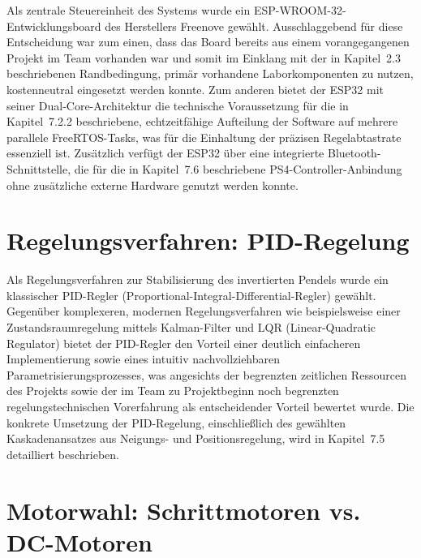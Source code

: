 \documentclass[12pt,ngerman,numbers=noenddot,abstracton,headsepline]{scrreprt}
\begin{document}
Als zentrale Steuereinheit des Systems wurde ein ESP-WROOM-32-Entwicklungsboard des Herstellers Freenove gewählt. Ausschlaggebend für diese Entscheidung war zum einen, dass das Board bereits aus einem vorangegangenen Projekt im Team vorhanden war und somit im Einklang mit der in Kapitel~2.3 beschriebenen Randbedingung, primär vorhandene Laborkomponenten zu nutzen, kostenneutral eingesetzt werden konnte. Zum anderen bietet der ESP32 mit seiner Dual-Core-Architektur die technische Voraussetzung für die in Kapitel~7.2.2 beschriebene, echtzeitfähige Aufteilung der Software auf mehrere parallele FreeRTOS-Tasks, was für die Einhaltung der präzisen Regelabtastrate essenziell ist. Zusätzlich verfügt der ESP32 über eine integrierte Bluetooth-Schnittstelle, die für die in Kapitel~7.6 beschriebene PS4-Controller-Anbindung ohne zusätzliche externe Hardware genutzt werden konnte.


\section{Regelungsverfahren: PID-Regelung}
\label{sec:pid_designentscheidung}

Als Regelungsverfahren zur Stabilisierung des invertierten Pendels wurde ein klassischer PID-Regler (Proportional-Integral-Differential-Regler) gewählt. Gegenüber komplexeren, modernen Regelungsverfahren wie beispielsweise einer Zustandsraumregelung mittels Kalman-Filter und LQR (Linear-Quadratic Regulator) bietet der PID-Regler den Vorteil einer deutlich einfacheren Implementierung sowie eines intuitiv nachvollziehbaren Parametrisierungsprozesses, was angesichts der begrenzten zeitlichen Ressourcen des Projekts sowie der im Team zu Projektbeginn noch begrenzten regelungstechnischen Vorerfahrung als entscheidender Vorteil bewertet wurde. Die konkrete Umsetzung der PID-Regelung, einschließlich des gewählten Kaskadenansatzes aus Neigungs- und Positionsregelung, wird in Kapitel~7.5 detailliert beschrieben.

\section{Motorwahl: Schrittmotoren vs. DC-Motoren}
\label{subsec:motorwahl_designentscheidung}
\end{document}
